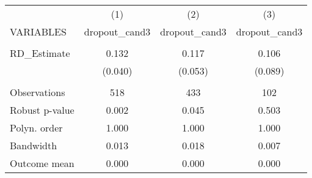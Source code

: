 \documentclass[]{article}
\begin{document}
\begin{tabular}{lccc} \hline
 & (1) & (2) & (3) \\
VARIABLES & dropout\_cand3 & dropout\_cand3 & dropout\_cand3 \\ \hline
 &  &  &  \\
RD\_Estimate & 0.132 & 0.117 & 0.106 \\
 & (0.040) & (0.053) & (0.089) \\
 &  &  &  \\
Observations & 518 & 433 & 102 \\
Robust p-value & 0.002 & 0.045 & 0.503 \\
Polyn. order & 1.000 & 1.000 & 1.000 \\
Bandwidth & 0.013 & 0.018 & 0.007 \\
 Outcome mean & 0.000 & 0.000 & 0.000 \\ \hline
\end{tabular}
\end{document}
